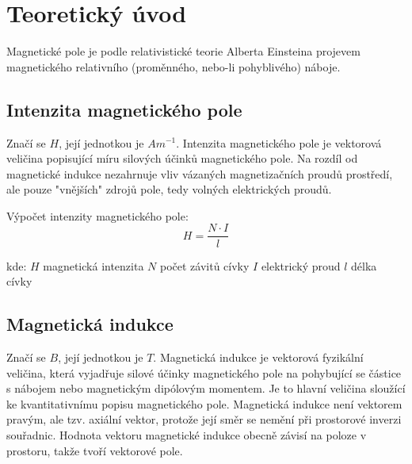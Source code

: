 \section{Teoretický úvod}
  \indent\indent
 Magnetické pole je podle relativistické teorie Alberta Einsteina projevem magnetického relativního (proměnného, nebo-li pohyblivého) náboje.
  
  \subsection{Intenzita magnetického pole}
  	\indent\indent
  	Značí se $H$, její jednotkou je $Am^{-1}$. Intenzita magnetického pole je vektorová veličina popisující míru silových účinků magnetického pole. Na rozdíl od magnetické indukce nezahrnuje vliv vázaných magnetizačních proudů prostředí, ale pouze "vnějších" zdrojů pole, tedy volných elektrických proudů.
  	
  	Výpočet intenzity magnetického pole:  	
		\begin{equation}
  		H = \dfrac{N \cdot I}{l}
  	\end{equation}
  	
  	\hspace*{2cm}kde:\newline    
  	\hspace*{4cm}$H$ \dotfill magnetická intenzita\hspace*{4cm}\newline
  	\hspace*{4cm}$N$ \dotfill počet závitů cívky\hspace*{4cm}\newline
  	\hspace*{4cm}$I$ \dotfill elektrický proud\hspace*{4cm}\newline
  	\hspace*{4cm}$l$ \dotfill délka cívky\hspace*{4cm}\newline
  
  \subsection{Magnetická indukce}
  	\indent\indent
  	Značí se $B$, její jednotkou je $T$. Magnetická indukce je vektorová fyzikální veličina, která vyjadřuje silové účinky magnetického pole na pohybující se částice s nábojem nebo magnetickým dipólovým momentem. Je to hlavní veličina sloužící ke kvantitativnímu popisu magnetického pole. Magnetická indukce není vektorem pravým, ale tzv. axiální vektor, protože její směr se nemění při prostorové inverzi souřadnic. Hodnota vektoru magnetické indukce obecně závisí na poloze v prostoru, takže tvoří vektorové pole.
  
